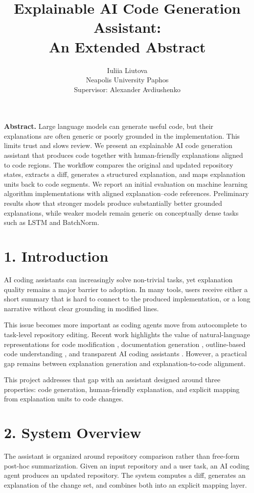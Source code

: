 \documentclass[11pt]{article}
\title{\textbf{Explainable AI Code Generation Assistant:\\
An Extended Abstract}}
\author{Iuliia Liutova \\ Neapolis University Paphos \\ Supervisor: Alexander Avdiushenko}
\date{}
\begin{document}
\maketitle

\textbf{Abstract.}
Large language models can generate useful code, but their explanations are often generic or poorly grounded in the implementation. This limits trust and slows review. We present an explainable AI code generation assistant that produces code together with human-friendly explanations aligned to code regions. The workflow compares the original and updated repository states, extracts a diff, generates a structured explanation, and maps explanation units back to code segments. We report an initial evaluation on machine learning algorithm implementations with aligned explanation--code references. Preliminary results show that stronger models produce substantially better grounded explanations, while weaker models remain generic on conceptually dense tasks such as LSTM and BatchNorm.

\section*{1. Introduction}
AI coding assistants can increasingly solve non-trivial tasks, yet explanation quality remains a major barrier to adoption. In many tools, users receive either a short summary that is hard to connect to the produced implementation, or a long narrative without clear grounding in modified lines.

This issue becomes more important as coding agents move from autocomplete to task-level repository editing. Recent work highlights the value of natural-language representations for code modification \cite{tang2025}, documentation generation \cite{yang2025}, outline-based code understanding \cite{shi2024}, and transparent AI coding assistants \cite{ye2025}. However, a practical gap remains between explanation generation and explanation-to-code alignment.

This project addresses that gap with an assistant designed around three properties: code generation, human-friendly explanation, and explicit mapping from explanation units to code changes.

\section*{2. System Overview}
The assistant is organized around repository comparison rather than free-form post-hoc summarization. Given an input repository and a user task, an AI coding agent produces an updated repository. The system computes a diff, generates an explanation of the change set, and combines both into an explicit mapping layer.
\end{document}

